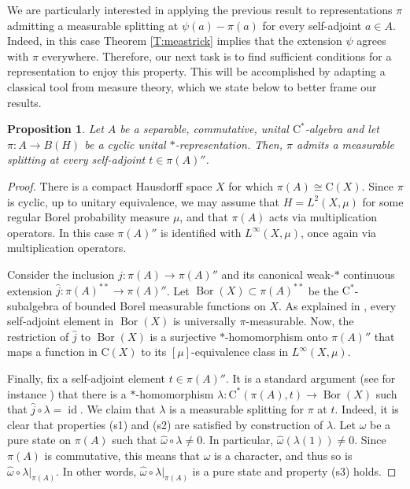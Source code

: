 \documentclass[10pt]{amsart}
\newcommand{\rC}{\mathrm{C}}
\newcommand{\id}{\operatorname{id}}
\newcommand{\Bor}{\operatorname{Bor}}
\newtheorem{proposition}[lemma]{Proposition}
\theoremstyle{definition}
\begin{document}
We are particularly interested in applying the previous result to representations $\pi$ admitting a measurable splitting at $\psi(a)-\pi(a)$ for every self-adjoint $a\in A$. Indeed, in this case Theorem \ref{T:meastrick} implies that the extension $\psi$ agrees with $\pi$ everywhere.  Therefore, our next task is to find sufficient conditions for a representation to enjoy this property. This will be accomplished by adapting a classical tool from measure theory, which we state below to better frame our results.


\begin{proposition}\label{P:Mah}
Let $A$ be a separable, commutative, unital $\rC^*$-algebra and let $\pi:A\to B(H)$ be a cyclic unital $*$-representation. %
Then, $\pi$ admits a measurable splitting at every self-adjoint $t\in \pi(A)''$.
\end{proposition}
\begin{proof}
There is a compact Hausdorff space $X$ for which $\pi(A)\cong \rC(X)$. Since $\pi$ is cyclic, up to unitary equivalence, we may assume that $H=L^2(X,\mu)$ for some regular Borel probability measure $\mu$, and that $\pi(A)$ acts via  multiplication operators. In this case $\pi(A)''$ is identified with  $L^\infty(X,\mu)$, once again via multiplication operators.

Consider the inclusion $j: \pi(A)\to \pi(A)''$ and its canonical weak-$*$ continuous extension $\widehat j:\pi(A)^{**}\to \pi(A)''$. Let $\Bor(X)\subset \pi(A)^{**}$ be the $\rC^*$-subalgebra of bounded Borel measurable functions on $X$. As explained in \cite[Paragraph 4.3.16]{eilers2018c}, every self-adjoint element in $\Bor(X)$ is universally $\pi$-measurable. Now, the restriction of $\widehat j$ to $\Bor(X)$ is a surjective $*$-homomorphism onto $\pi(A)''$ that maps a function in $\rC(X)$ to its $[\mu]$-equivalence class in $L^\infty(X,\mu)$. 

Finally, fix a self-adjoint element $t\in \pi(A)''$. It is a standard argument (see for instance \cite[Corollary 2, page 91]{arveson2012invitation}) that there is a $*$-homomorphism $\lambda:\rC^*(\pi(A),t)\to \Bor(X)$ such that $\widehat j \circ \lambda=\id$.  We claim that $\lambda$ is a measurable splitting for $\pi$ at $t$. Indeed, it is clear that properties (s1) and (s2) are satisfied by construction of $\lambda$.
Let $\omega$ be a pure state on $\pi(A)$ such that $\widehat\omega\circ \lambda\neq 0$. In particular,  $\widehat\omega(\lambda(1))\neq 0$. Since $\pi(A)$ is commutative, this means that $\omega$ is a character, and thus so is $\widehat\omega\circ \lambda|_{\pi(A)}$. In other words, $\widehat\omega\circ \lambda|_{\pi(A)}$ is a pure state and property (s3) holds.
\end{proof}
\end{document}
